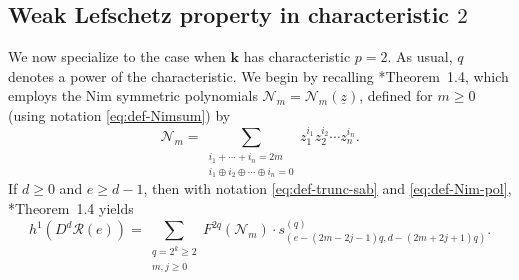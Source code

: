 \documentclass[11pt,reqno]{amsart}
\newcommand{\defi}[1]{{\upshape\sffamily #1}}
\def\kk{{\mathbf k}}
\newcommand{\mc}[1]{\mathcal{#1}}
\newcommand{\ul}[1]{\underline{#1}}
\theoremstyle{definition}
\theoremstyle{remark}
\numberwithin{equation}{section}
\begin{document}
\subsection{Weak Lefschetz property in characteristic $2$}\label{subsec:WLP-char2} 
We now specialize to the case when $\kk$ has characteristic $p=2$. As usual, $q$ denotes a power of the characteristic. We begin by recalling \cite{KMRR}*{Theorem~1.4}, which employs the \defi{Nim symmetric polynomials} $\mc{N}_m=\mc{N}_m(\ul{z})$, defined for $m\geq 0$ (using notation \eqref{eq:def-Nimsum}) by
\begin{equation}\label{eq:def-Nim-pol}
 \mc{N}_m = \sum_{\substack{i_1+\cdots+i_n=2m \\ i_1\oplus i_2\oplus\cdots\oplus i_n = 0}} z_1^{i_1} z_2^{i_2}\cdots z_n^{i_n}.
\end{equation}
If $d\geq 0$ and $e\geq d-1$, then with notation \eqref{eq:def-trunc-sab} and \eqref{eq:def-Nim-pol}, \cite{KMRR}*{Theorem~1.4} yields
\begin{equation}\label{eq:h1DdRe-char2}  h^1(D^d\mc{R}(e)) = \sum_{\substack{q=2^k\geq 2 \\ m,j\geq 0}} F^{2q}(\mc{N}_m)\cdot s^{(q)}_{(e-(2m-2j-1)q,d-(2m+2j+1)q)}.
\end{equation}
\end{document}
